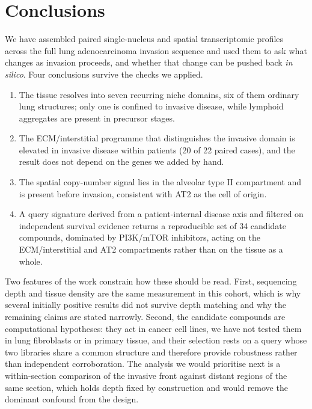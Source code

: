 \section{Conclusions}

We have assembled paired single-nucleus and spatial transcriptomic profiles across the full
lung adenocarcinoma invasion sequence and used them to ask what changes as invasion
proceeds, and whether that change can be pushed back \emph{in silico}. Four conclusions
survive the checks we applied.

\begin{enumerate}\itemsep2pt
\item The tissue resolves into seven recurring niche domains, six of them ordinary lung
structures; only one is confined to invasive disease, while lymphoid aggregates are present
in precursor stages.

\item The ECM/interstitial programme that distinguishes the invasive domain is elevated in
invasive disease within patients (20 of 22 paired cases), and the result does not depend on
the genes we added by hand.

\item The spatial copy-number signal lies in the alveolar type II compartment and is
present before invasion, consistent with AT2 as the cell of origin.

\item A query signature derived from a patient-internal disease axis and filtered on
independent survival evidence returns a reproducible set of 34 candidate compounds,
dominated by PI3K/mTOR inhibitors, acting on the ECM/interstitial and AT2 compartments
rather than on the tissue as a whole.
\end{enumerate}

Two features of the work constrain how these should be read. First, sequencing depth and
tissue density are the same measurement in this cohort, which is why several initially
positive results did not survive depth matching and why the remaining claims are stated
narrowly. Second, the candidate compounds are computational hypotheses: they act in cancer
cell lines, we have not tested them in lung fibroblasts or in primary tissue, and their
selection rests on a query whose two libraries share a common structure and therefore
provide robustness rather than independent corroboration. The analysis we would prioritise
next is a within-section comparison of the invasive front against distant regions of the
same section, which holds depth fixed by construction and would remove the dominant
confound from the design.
